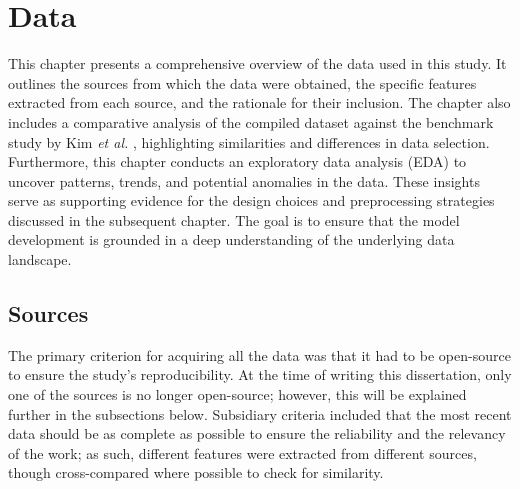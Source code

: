 \documentclass[ %
                    author={Raj Dhakan},
                supervisor={Dr. Ayush Joshi},
                    degree={MSc},
                     title={Ethereum Price Prediction using Internal and External Factors},
                  subtitle={},
                      type={},
                      year={2025}]{dissertation}
\begin{document}

\chapter{Data}
\label{chap:data}
This chapter presents a comprehensive overview of the data used in this study. It outlines the sources from which the data were obtained, the specific features extracted from each source, and the rationale for their inclusion. The chapter also includes a comparative analysis of the compiled dataset against the benchmark study by Kim \textit{et al.} \cite{RN141}, highlighting similarities and differences in data selection. Furthermore, this chapter conducts an exploratory data analysis (EDA) to uncover patterns, trends, and potential anomalies in the data. These insights serve as supporting evidence for the design choices and preprocessing strategies discussed in the subsequent chapter. The goal is to ensure that the model development is grounded in a deep understanding of the underlying data landscape.

\section{Sources}
The primary criterion for acquiring all the data was that it had to be open-source to ensure the study's reproducibility. At the time of writing this dissertation, only one of the sources is no longer open-source; however, this will be explained further in the subsections below. Subsidiary criteria included that the most recent data should be as complete as possible to ensure the reliability and the relevancy of the work; as such, different features were extracted from different sources, though cross-compared where possible to check for similarity. 
\end{document}
